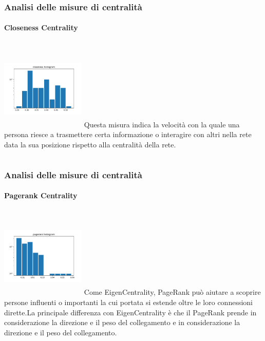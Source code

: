 \documentclass{beamer}
\begin{document}

\begin{frame}
\frametitle{Analisi delle misure di centralità}
\framesubtitle{Closeness Centrality}
\begin{columns}
             \centering
             \includegraphics[height=4cm, 
             width=4cm]{images/centrality_measures/closeness.pdf}
             Questa misura indica la velocità con la quale una persona riesce a trasmettere certa informazione o interagire con altri nella rete data la sua posizione rispetto alla centralità della rete. 
         \end{columns} 

\end{frame}

\begin{frame}
\frametitle{Analisi delle misure di centralità}
\framesubtitle{Pagerank Centrality}
\begin{columns}
             \centering
             \includegraphics[height=4cm, 
             width=4cm]{images/centrality_measures/pagerank.pdf}
       Come EigenCentrality, PageRank può aiutare a scoprire persone influenti o importanti la cui portata si estende oltre le loro connessioni dirette.La principale differenza con EigenCentrality è che il PageRank prende in considerazione la direzione e il peso del collegamento e in considerazione la direzione e il peso del collegamento.
         \end{columns} 

\end{frame}
\end{document}
